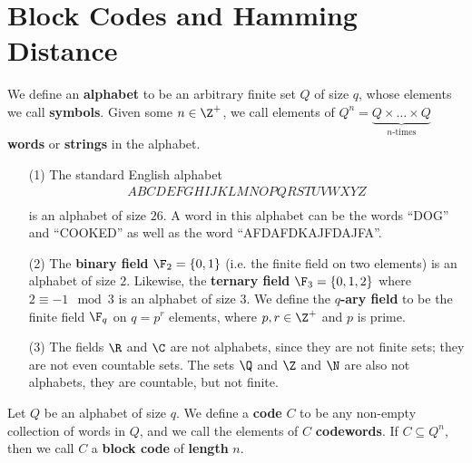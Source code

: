 \section{Block Codes and Hamming Distance}\label{section_1.1}

\begin{definition}
  We define an \textbf{alphabet} to be an arbitrary finite set $Q$ of size $q$,
  whose elements we call \textbf{symbols}. Given some $n \in \Z^+$, we call
  elements of $Q^n=\underbrace{Q \times \dots \times Q}_{n\text{-times}}$
  \textbf{words} or \textbf{strings} in the alphabet.
\end{definition}

\begin{example}\label{example_1.1}
  \begin{enumerate}
    \item[(1)] The standard English alphabet
      \begin{align*}
        A B C D E F G H I J K L M N O P Q R S T U V W X Y Z \\
      \end{align*}
      is an alphabet of size $26$. A word in this alphabet can be the words
      ``DOG'' and ``COOKED'' as well as the word ``AFDAFDKAJFDAJFA''.

    \item[(2)] The \textbf{binary field} $\F_2=\{0,1\}$  (i.e. the finite field
      on two elements) is an alphabet of size $2$. Likewise, the
      \textbf{ternary field} $\F_3=\{0,1,2\}$ where $2 \equiv -1 \mod{3}$ is an
      alphabet of size $3$. We define the  \textbf{$q$-ary field} to be the
      finite field $\F_q$ on $q=p^r$ elements, where  $p,r \in \Z^+$ and $p$ is
      prime.

    \item[(3)] The fields $\R$ and $\C$ are not alphabets, since they are not
      finite sets; they are not even countable sets. The sets $\Q$ and $\Z$ and
      $\N$ are also not alphabets, they are countable, but not finite.
  \end{enumerate}
\end{example}

\begin{definition}
  Let $Q$ be an alphabet of size $q$. We define a \textbf{code} $C$ to be any
  non-empty collection of words in $Q$, and we call the elements of $C$
  \textbf{codewords}. If $C \subseteq Q^n$, then we call $C$ a  \textbf{block
  code} of \textbf{length} $n$.
\end{definition}

